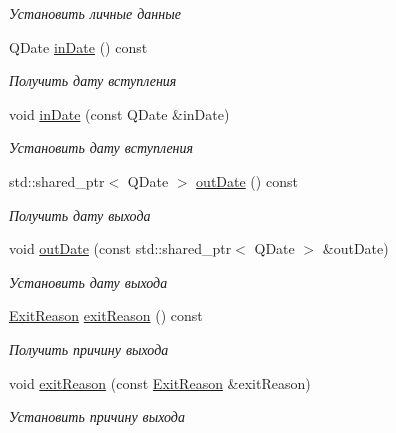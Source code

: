 \begin{DoxyCompactItemize}
\begin{DoxyCompactList}\small\item\em Установить личные данные \end{DoxyCompactList}\item 
Q\+Date \hyperlink{classkpk_1_1data_1_1_member_a94ae4a3def291913ce30f0e56f5211b3}{in\+Date} () const 
\begin{DoxyCompactList}\small\item\em Получить дату вступления \end{DoxyCompactList}\item 
void \hyperlink{classkpk_1_1data_1_1_member_a2bb634fd8da7526a8a4ca525c1b563c3}{in\+Date} (const Q\+Date \&in\+Date)
\begin{DoxyCompactList}\small\item\em Установить дату вступления \end{DoxyCompactList}\item 
std\+::shared\+\_\+ptr$<$ Q\+Date $>$ \hyperlink{classkpk_1_1data_1_1_member_aed8afbda021f8db04a63b685fe365470}{out\+Date} () const 
\begin{DoxyCompactList}\small\item\em Получить дату выхода \end{DoxyCompactList}\item 
void \hyperlink{classkpk_1_1data_1_1_member_a43acac53b339840051bac955dd8b52ec}{out\+Date} (const std\+::shared\+\_\+ptr$<$ Q\+Date $>$ \&out\+Date)
\begin{DoxyCompactList}\small\item\em Установить дату выхода \end{DoxyCompactList}\item 
\hyperlink{namespacekpk_1_1data_a16790bc647a6788cab282e185ee28998}{Exit\+Reason} \hyperlink{classkpk_1_1data_1_1_member_afc92f22903dc9dfe70a4a83b6f203a06}{exit\+Reason} () const 
\begin{DoxyCompactList}\small\item\em Получить причину выхода \end{DoxyCompactList}\item 
void \hyperlink{classkpk_1_1data_1_1_member_afab382ccecb06ff6de6de4e5ffdded42}{exit\+Reason} (const \hyperlink{namespacekpk_1_1data_a16790bc647a6788cab282e185ee28998}{Exit\+Reason} \&exit\+Reason)
\begin{DoxyCompactList}\small\item\em Установить причину выхода \end{DoxyCompactList}\end{DoxyCompactItemize}
